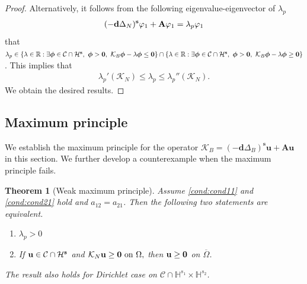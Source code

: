 \documentclass[a4paper,11pt]{amsart}
\newtheorem{theorem}{Theorem}
\theoremstyle{definition}
\def\R{\mathbb{R}}
\def\O{\Omega}
\numberwithin{equation}{section}
\theoremstyle{definition}
\def\O{\Omega}
\begin{document}
\begin{proof}
Alternatively, it follows from the following eigenvalue-eigenvector of $\lambda_p$
\begin{align*}
(-\textbf{d}\Delta_N)^{\textbf{s}}\varphi_1 + {\bf A}\varphi_1 = \lambda_p \varphi_1
\end{align*}
that $\lambda_p\in \left\{\lambda\in \R:\exists \boldsymbol{\phi}\in \mathcal{C}\cap \mathcal{H}^{\bf s},~\boldsymbol{\phi}>{\bf 0},~\mathcal{K}_B{\bf \boldsymbol{\phi}}-\lambda\boldsymbol{\phi} \leq  {\bf 0} \right\}\cap \left\{\lambda\in \R:\exists \boldsymbol{\phi}\in \mathcal{C}\cap \mathcal{H}^{\bf s},~\boldsymbol{\phi}>{\bf 0},~\mathcal{K}_B{\bf \boldsymbol{\phi}}-\lambda\boldsymbol{\phi} \geq  {\bf 0} \right\}$. This implies that
\begin{align*}
\lambda_p'\left(\mathcal{K}_N\right)\leq \lambda_p\leq \lambda_p''\left(\mathcal{K}_N\right).
\end{align*}
We obtain the desired results.
	
\end{proof}




\subsection{\bf Maximum principle}

We establish the maximum principle for the operator $\mathcal{K}_B=(-\textbf{d}\Delta_B)^{\textbf{s}}\textbf{u} + \textbf{Au} $ in this section. We further develop a counterexample when the maximum principle fails.



\begin{theorem}[Weak maximum principle]
Assume \ref{cond:cond11} and \ref{cond:cond21} hold and $a_{12}=a_{21}$. Then the following two statements are equivalent.
\begin{enumerate}[label=(\roman*)]
\item\label{positivity} $\lambda_p>0$

\item\label{WKP} If ${\bf u}\in \mathcal{C}\cap \mathcal{H}^{\bf s}$ and $ \mathcal{K}_N{\bf u}\geq {\bf 0} \text{ on }\O,$ then ${\bf u}\geq {\bf 0}$ on $\overline{\O}$.



\end{enumerate}
The result also holds for Dirichlet case on $\mathcal{C}\cap \mathbb{H}^{s_1}\times \mathbb{H}^{s_2}$.

\end{theorem}
\end{document}
